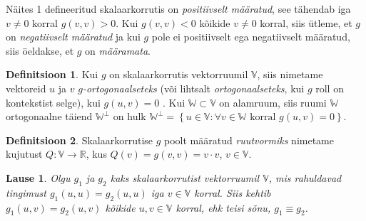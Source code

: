 \documentclass[a4paper,12pt]{article}
\theoremstyle{plain}
\newtheorem{lause}{Lause}[section]
\theoremstyle{definition}
\newtheorem{definitsioon}{Definitsioon}[section]
\numberwithin{equation}{section}
\begin{document}
Näites 1 defineeritud skalaarkorrutis on \emph{positiivselt määratud}, see tähendab iga $v \neq 0$ korral $g \left(v, v \right) > 0$. Kui $g \left(v, v \right) < 0$ kõikide $v \neq 0$ korral, siis ütleme, et $g$ on \emph{negatiivselt määratud} ja kui $g$ pole ei positiivselt ega negatiivselt määratud, siis öeldakse, et $g$ on \emph{määramata}.

\begin{definitsioon}
Kui $g$ on skalaarkorrutis vektorruumil $\mathbb{V}$, siis nimetame vektoreid $u$ ja $v$ \emph{$g$-ortogonaalseteks} (või lihtsalt \emph{ortogonaalseteks}, kui $g$ roll on kontekstist selge), kui $g \left( u, v \right) = 0$ . Kui $\mathbb{W} \subset \mathbb{V}$ on alamruum, siis ruumi $\mathbb{W}$ ortogonaalne täiend $\mathbb{W}^{\perp}$ on hulk $\mathbb{W}^{\perp} = \left\lbrace u \in \mathbb{V} : \forall v \in  \mathbb{W} \text{ korral } g \left(u, v \right) = 0 \right\rbrace$.
\end{definitsioon}
\begin{definitsioon}
Skalaarkorrutise $g$ poolt määratud \emph{ruutvormiks} nimetame kujutust $Q : \mathbb{V} \rightarrow \mathbb{R}$, kus $Q \left( v \right) = g\left(v, v\right) = v \cdot v$, $v \in \mathbb{V}$.
\end{definitsioon}

\begin{lause} \label{lause:skalaarkorrutise-yhesus}
Olgu $g_1$ ja $g_2$ kaks skalaarkorrutist vektorruumil $\mathbb{V}$, mis rahuldavad tingimust $g_1 \left(u, u \right) = g_2 \left(u, u \right)$ iga $v \in \mathbb{V}$ korral. Siis kehtib $g_1 \left(u, v \right) = g_2 \left(u, v \right)$ kõikide $u, v \in \mathbb{V}$ korral, ehk teisi sõnu, $g_1 \equiv g_2$.
\end{lause}
\end{document}
